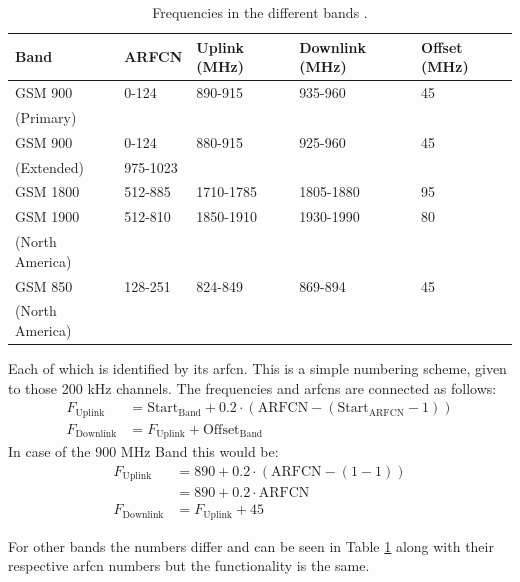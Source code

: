 \begin{table}
\centering
\begin{tabular}{lllll}
\toprule
Band		&ARFCN		&Uplink (MHz)	&Downlink (MHz)	&Offset (MHz)\\
\midrule
GSM 900		&0-124		&890-915		&935-960		&45\\
(Primary)	&			&				&				&\\
GSM 900		&0-124		&880-915		&925-960		&45\\
(Extended)	&975-1023	&				&				&\\
GSM 1800	&512-885	&1710-1785		&1805-1880		&95\\
GSM 1900	&512-810	&1850-1910		&1930-1990		&80\\
(North America)	&			&				&				&\\
GSM 850		&128-251	&824-849		&869-894		&45\\
(North America)	&			&				&				&\\
\bottomrule
\end{tabular}
\caption{Frequencies in the different bands \cite{kommsys2006}.}
\label{tab:frequencies}
\end{table}

Each of which is identified by its \gls{arfcn}.
This is a simple numbering scheme, given to those 200 kHz channels.
The frequencies and \glspl{arfcn} are connected as follows:
\begin{align}
F_\text{Uplink} 	&= \text{Start}_\text{Band} + 0.2 \cdot (\text{ARFCN} -(\text{Start}_\text{ARFCN} -1))\\
F_\text{Downlink}   &= F_\text{Uplink} + \text{Offset}_\text{Band}
\end{align}
In case of the 900 MHz Band this would be:
\begin{align}
F_\text{Uplink}		&=890 + 0.2 \cdot (\text{ARFCN} - (1-1))\\
					&=890 + 0.2 \cdot \text{ARFCN}\\
F_\text{Downlink}	&=F_\text{Uplink} + 45
\end{align}

For other bands the numbers differ and can be seen in Table \ref{tab:frequencies} along with their respective \gls{arfcn} numbers but the functionality is the same.

